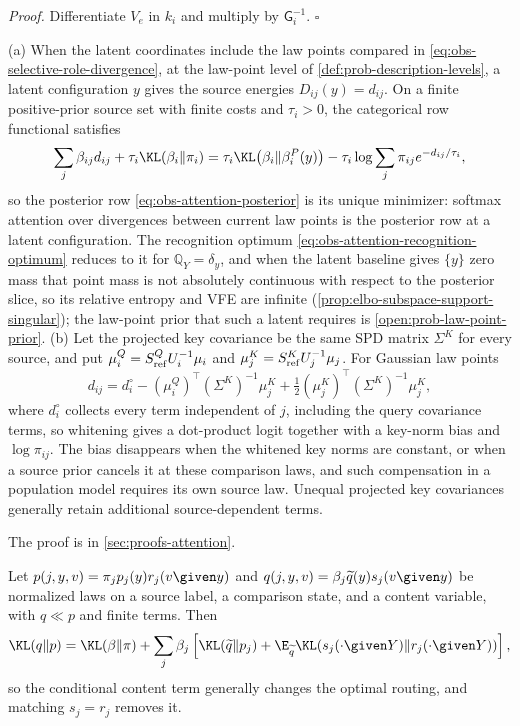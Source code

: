 \noindent\emph{Proof.}
Differentiate \(V_e\) in \(k_i\) and multiply by \(\mathsf G_i^{-1}\).
\(\square\)

(a) When the latent coordinates include the law points compared in
\eqref{eq:obs-selective-role-divergence}, at the law-point level of
\cref{def:prob-description-levels}, a latent configuration \(y\) gives the
source energies \(D_{ij}(y)=d_{ij}\). On a finite positive-prior source set
with finite costs and \(\tau_i>0\), the categorical row functional satisfies
\begin{equation}
\sum_j\beta_{ij}d_{ij}+\tau_i\KL(\beta_i\Vert\pi_i)
=\tau_i\KL\bigl(\beta_i\Vert\beta_i^P(y)\bigr)
-\tau_i\log\sum_j\pi_{ij}e^{-d_{ij}/\tau_i},
\label{eq:obs-selective-row-functional}
\end{equation}
so the posterior row \eqref{eq:obs-attention-posterior} is its unique
minimizer: softmax attention over divergences between current law points is
the posterior row at a latent configuration. The recognition optimum
\eqref{eq:obs-attention-recognition-optimum} reduces to it for
\(\mathbb Q_Y=\delta_y\), and when the latent baseline gives \(\{y\}\) zero mass
that point mass is not absolutely continuous with respect to the posterior
slice, so its relative entropy and VFE are infinite
(\cref{prop:elbo-subspace-support-singular}); the law-point prior that such a
latent requires is \cref{open:prob-law-point-prior}. (b) Let the projected key
covariance be the same SPD matrix \(\Sigma^K\) for every source, and put
\(\mu_i^Q=S^Q_{\rm ref}U_i^{-1}\mu_i\) and \(\mu_j^K=S^K_{\rm ref}U_j^{-1}\mu_j\).
For Gaussian law points
\begin{equation}
d_{ij}=d_i^\circ-(\mu_i^Q)^\top(\Sigma^K)^{-1}\mu_j^K
+\tfrac12(\mu_j^K)^\top(\Sigma^K)^{-1}\mu_j^K,
\label{eq:obs-selective-dot-product}
\end{equation}
where \(d_i^\circ\) collects every term independent of \(j\), including the
query covariance terms, so whitening gives a dot-product logit together with a
key-norm bias and \(\log\pi_{ij}\). The bias disappears when the whitened key
norms are constant, or when a source prior cancels it at these comparison
laws, and such compensation in a population model requires its own source
law. Unequal projected key covariances generally retain additional
source-dependent terms.

The proof is in \cref{sec:proofs-attention}.

Let \(p(j,y,v)=\pi_jp_j(y)r_j(v\given y)\) and
\(q(j,y,v)=\beta_j\widetilde q(y)s_j(v\given y)\) be normalized laws on a
source label, a comparison state, and a content variable, with \(q\ll p\) and
finite terms. Then
\begin{equation}
\KL(q\Vert p)=\KL(\beta\Vert\pi)+
\sum_j\beta_j\left[
\KL(\widetilde q\Vert p_j)+
\E_{\widetilde q}\KL(s_j(\cdot\given Y)\Vert r_j(\cdot\given Y))\right],
\label{eq:obs-selective-content-kl}
\end{equation}
so the conditional content term generally changes the optimal routing, and
matching \(s_j=r_j\) removes it.

